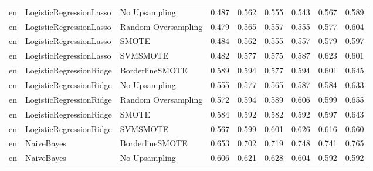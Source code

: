 \begin{tabular}{lllllllll}
      en &      LogisticRegressionLasso &       No Upsampling & 0.487 &                     0.562 &                 0.555 &                  0.543 &                                   0.567 &     0.589 \\
      en &      LogisticRegressionLasso & Random Oversampling & 0.479 &                     0.565 &                 0.557 &                  0.555 &                                   0.577 &     0.604 \\
      en &      LogisticRegressionLasso &               SMOTE & 0.484 &                     0.562 &                 0.555 &                  0.557 &                                   0.579 &     0.597 \\
      en &      LogisticRegressionLasso &            SVMSMOTE & 0.482 &                     0.577 &                 0.575 &                  0.587 &                                   0.623 &     0.601 \\
      en &      LogisticRegressionRidge &     BorderlineSMOTE & 0.589 &                     0.594 &                 0.577 &                  0.594 &                                   0.601 &     0.645 \\
      en &      LogisticRegressionRidge &       No Upsampling & 0.555 &                     0.577 &                 0.565 &                  0.587 &                                   0.584 &     0.633 \\
      en &      LogisticRegressionRidge & Random Oversampling & 0.572 &                     0.594 &                 0.589 &                  0.606 &                                   0.599 &     0.655 \\
      en &      LogisticRegressionRidge &               SMOTE & 0.584 &                     0.592 &                 0.582 &                  0.592 &                                   0.597 &     0.643 \\
      en &      LogisticRegressionRidge &            SVMSMOTE & 0.567 &                     0.599 &                 0.601 &                  0.626 &                                   0.616 &     0.660 \\
      en &                   NaiveBayes &     BorderlineSMOTE & 0.653 &                     0.702 &                 0.719 &                  0.748 &                                   0.741 &     0.765 \\
      en &                   NaiveBayes &       No Upsampling & 0.606 &                     0.621 &                 0.628 &                  0.604 &                                   0.592 &     0.592 \\

\end{tabular}
